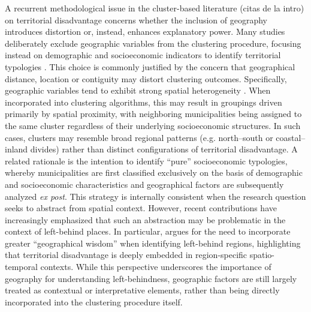\documentclass[a4paper,11pt,oneside]{article}
\begin{document}
A recurrent methodological issue in the cluster-based literature {\color{red}(citas de la intro)} on territorial disadvantage concerns whether the inclusion of geography introduces distortion or, instead, enhances explanatory power. Many studies deliberately exclude geographic variables from the clustering procedure, focusing instead on demographic and socioeconomic indicators to identify territorial typologies \citep[see, for instance,][]{hedlund2016mapping, jessen2024role, velthuis2024regional, kronthaler2005economic}. This choice is commonly justified by the concern that geographical distance, location or contiguity may distort clustering outcomes. Specifically, geographic variables tend to exhibit strong spatial heterogeneity \citep{anselin1988spatial}. When incorporated into clustering algorithms, this may result in groupings driven primarily by spatial proximity, with neighboring municipalities being assigned to the same cluster regardless of their underlying socioeconomic structures. In such cases, clusters may resemble broad regional patterns (e.g. north--south or coastal--inland divides) rather than distinct configurations of territorial disadvantage. A related rationale is the intention to identify ``pure'' socioeconomic typologies, whereby municipalities are first classified exclusively on the basis of demographic and socioeconomic characteristics and geographical factors are subsequently analyzed \textsl{ex post}. This strategy is internally consistent when the research question seeks to abstract from spatial context. However, recent contributions have increasingly emphasized that such an abstraction may be problematic in the context of left-behind places. In particular, \citet{jessen2024role} argues for the need to incorporate greater ``geographical wisdom'' when identifying left-behind regions, highlighting that territorial disadvantage is deeply embedded in region-specific spatio-temporal contexts. While this perspective underscores the importance of geography for understanding left-behindness, geographic factors are still largely treated as contextual or interpretative elements, rather than being directly incorporated into the clustering procedure itself.
\end{document}
